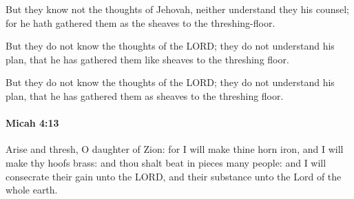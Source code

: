 			\begin{versebox}
					\item[BHS] 
					\item[LXX] 
					\item[ASV] But they know not the thoughts of Jehovah, neither understand they his counsel; for he hath gathered them as the sheaves to the threshing-floor.
					\item[NIV] But they do not know the thoughts of the LORD; they do not understand his plan, that he has gathered them like sheaves to the threshing floor.
					\item[NRSV] But they do not know the thoughts of the LORD; they do not understand his plan, that he has gathered them as sheaves to the threshing floor.
			\end{versebox}

		\paragraph{Micah 4:13} %
			\label{MICAH-4-13}

			Arise and thresh, O daughter of Zion: for I will make thine horn iron, and I will make thy hoofs brass: and thou shalt beat in pieces many people: and I will consecrate their gain unto the LORD, and their substance unto the Lord of the whole earth.


